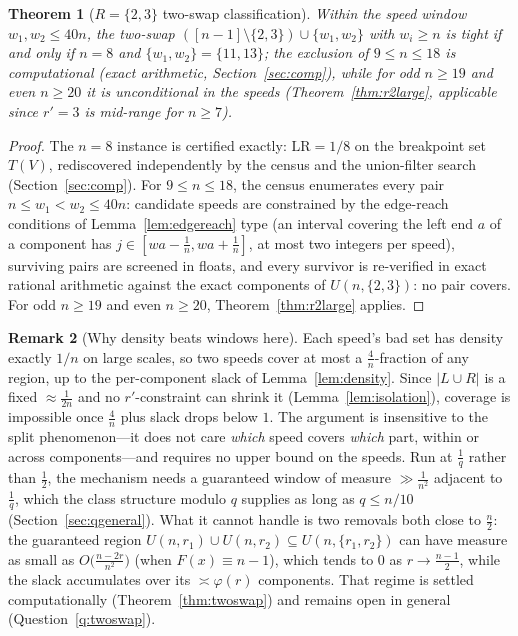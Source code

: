 \documentclass[11pt]{article}
\newtheorem{theorem}{Theorem}[section]
\theoremstyle{definition}
\newtheorem{remark}[theorem]{Remark}
\newcommand{\LR}{\mathrm{LR}}
\begin{document}
\begin{theorem}[$R=\{2,3\}$ two-swap classification]\label{thm:r23}
Within the speed window $w_1,w_2\le40n$, the two-swap
$([n-1]\setminus\{2,3\})\cup\{w_1,w_2\}$ with $w_i\ge n$ is tight if and
only if $n=8$ and $\{w_1,w_2\}=\{11,13\}$; the exclusion of $9\le n\le18$
is computational (exact arithmetic, Section~\ref{sec:comp}), while for
odd $n\ge19$ and even $n\ge20$ it is unconditional in the speeds
(Theorem~\ref{thm:r2large}, applicable since $r'=3$ is mid-range for
$n\ge7$).
\end{theorem}

\begin{proof}
The $n=8$ instance is certified exactly: $\LR=1/8$ on the breakpoint set
$T(V)$, rediscovered independently by the census and the union-filter
search (Section~\ref{sec:comp}).  For $9\le n\le18$, the census enumerates every
pair $n\le w_1<w_2\le40n$: candidate speeds are constrained by the
edge-reach conditions of Lemma~\ref{lem:edgereach} type (an interval
covering the left end $a$ of a component has $j\in[wa-\frac1n,wa+\frac1n]$,
at most two integers per speed), surviving pairs are screened in floats,
and every survivor is re-verified in exact rational arithmetic against
the exact components of $U(n,\{2,3\})$: no pair covers.  For odd $n\ge19$
and even $n\ge20$, Theorem~\ref{thm:r2large} applies.
\end{proof}

\begin{remark}[Why density beats windows here]\label{rem:density}
Each speed's bad set has density exactly $1/n$ on large scales, so two
speeds cover at most a $\tfrac4n$-fraction of any region, up to the
per-component slack of Lemma~\ref{lem:density}.  Since $|L\cup R|$ is a
fixed $\approx\frac1{2n}$ and no $r'$-constraint can shrink it
(Lemma~\ref{lem:isolation}), coverage is impossible once $\tfrac4n$ plus
slack drops below $1$.  The argument is insensitive to the split
phenomenon---it does not care \emph{which} speed covers \emph{which}
part, within or across components---and requires no upper bound on the
speeds.  Run at $\tfrac1q$ rather than $\tfrac12$, the mechanism needs a
guaranteed window of measure $\gg\frac1{n^2}$ adjacent to $\tfrac1q$,
which the class structure modulo $q$ supplies as long as $q\le n/10$
(Section~\ref{sec:qgeneral}).  What it cannot handle is two removals
both close to $\tfrac n2$: the guaranteed region
$U(n,r_1)\cup U(n,r_2)\subseteq U(n,\{r_1,r_2\})$ can have measure as
small as $O\bigl(\frac{n-2r}{n^2}\bigr)$ (when $F(x)\equiv n-1$),
which tends to $0$ as $r\to\frac{n-1}2$, while the slack accumulates
over its $\asymp\varphi(r)$ components.  That regime is settled
computationally (Theorem~\ref{thm:twoswap}) and remains open in general
(Question~\ref{q:twoswap}).
\end{remark}
\end{document}
